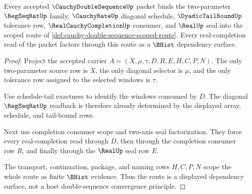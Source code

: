 \begin{theorem}
\label{thm:cauchy-double-sequence-scoped-diagonal-route}
Every accepted $\CauchyDoubleSequenceUp$ packet binds the two-parameter $\RegSeqRatUp$ family, $\CauchyRateUp$ diagonal schedule, $\DyadicTailBoundUp$ tolerance row, $\RealCauchyCompletionUp$ consumer, and $\RealUp$ seal into the scoped route of \autoref{def:cauchy-double-sequence-scoped-route}. Every real-completion read of the packet factors through this route as a $\BHist$ dependency surface.
\end{theorem}
\begin{proof}
Project the accepted carrier $A=(X,\mu,\tau,D,R,E,H,C,P,N)$. The only two-parameter source row is $X$, the only diagonal selector is $\mu$, and the only tolerance row assigned to the selected windows is $\tau$.

Use schedule-tail exactness to identify the windows consumed by $D$. The diagonal $\RegSeqRatUp$ readback is therefore already determined by the displayed array, schedule, and tail-bound rows.

Next use completion consumer scope and two-axis seal factorization. They force every real-completion read through $D$, then through the completion consumer row $R$, and finally through the $\RealUp$ seal row $E$.

The transport, continuation, package, and naming rows $H,C,P,N$ scope the whole route as finite $\BHist$ evidence. Thus the route is a displayed dependency surface, not a host double-sequence convergence principle.
\end{proof}

